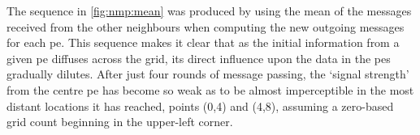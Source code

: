 The sequence in \cref{fig:nmp:mean} was produced by using the mean of the messages received from the other neighbours when computing the new outgoing messages for each \gls{pe}.  This sequence makes it clear that as the initial information from a given \gls{pe} diffuses across the grid, its direct influence upon the data in the \glspl{pe} gradually dilutes.  After just four rounds of message passing, the `signal strength' from the centre \gls{pe} has become so weak as to be almost imperceptible in the most distant locations it has reached, \eg{} points (0,4) and (4,8), assuming a zero-based grid count beginning in the upper-left corner.